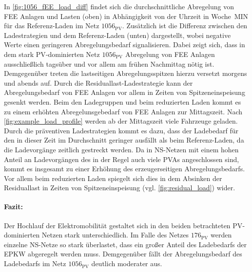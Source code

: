 In \autoref{fig:1056_fEE_load_diff} findet sich die durchschnittliche Abregelung von \gls{FEE} Anlagen und Lasten (oben) in Abhängigkeit von der Uhrzeit in Woche~MIN für das Referenz-Laden im Netz \(1056_{\text{PV}}\).
Zusätzlich ist die Differenz zwischen den Ladestrategien und dem Referenz-Laden (unten) dargestellt, wobei negative Werte einen geringeren Abregelungsbedarf signalisieren.
Dabei zeigt sich, dass in dem stark \gls{PV}-dominierten Netz \(1056_{\text{PV}}\) Abregelung von \gls{FEE} Anlagen ausschließlich tagsüber und vor allem am frühen Nachmittag nötig ist.
Demgegenüber treten die lastseitigen Abregelungsspitzen hierzu versetzt morgens und abends auf.
Durch die Residuallast-Ladestrategie kann der Abregelungsbedarf von \gls{FEE} Anlagen vor allem in Zeiten von Spitzeneinspeisung gesenkt werden.
Beim den Ladegruppen und beim reduzierten Laden kommt es zu einem erhöhten Abregelunsgebedarf von \gls{FEE} Anlagen zur Mittagszeit.
Nach \autoref{fig:example_load_profile} werden ab der Mittagszeit viele Fahrzeuge \zH geladen.
Durch die präventiven Ladestrategien kommt es dazu, dass der Ladebedarf für den \UC \zH in dieser Zeit im Durchschnitt geringer ausfällt als beim Referenz-Laden, da die Ladevorgänge zeitlich gestreckt werden.
Da in \gls{NS}-Netzen mit einem hohen Anteil an Ladevorgängen des \UCs \zH in der Regel auch viele \glspl{PVA} angeschlossen sind, kommt es insgesamt zu einer Erhöhung des erzeugerseitigen Abregelungsbedarfs.
Vor allem beim reduzierten Laden spiegelt sich dies in dem Absinken der Residuallast in Zeiten von Spitzeneinspeisung (vgl. \autoref{fig:residual_load}) wider.





\paragraph{Fazit:}

Der Hochlauf der Elektromobilität gestaltet sich in den beiden betrachteten \gls{PV}-dominierten Netzen stark unterschiedlich.
Im Falle des Netzes \(176_{\text{PV}}\) werden einzelne \gls{NS}-Netze so stark überlastet, dass ein großer Anteil des Ladebedarfs der \gls{EPKW} abgeregelt werden muss.
Demgegenüber fällt der Abregelungsbedarf des Ladebedarfs im Netz \(1056_{\text{PV}}\) deutlich moderater aus. \medskip

